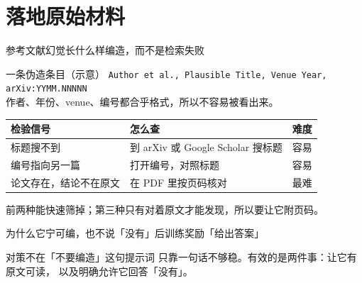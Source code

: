 \documentclass[aspectratio=169]{beamer}
\begin{document}
\section[落地材料]{落地原始材料}

\begin{frame}{参考文献幻觉长什么样}{编造，而不是检索失败}
  \begin{alertblock}{一条伪造条目（示意）}
    \small
    \texttt{Author et al., Plausible Title, Venue Year, arXiv:YYMM.NNNNN}\\[2pt]
    作者、年份、venue、编号都合乎格式，所以不容易被看出来。
  \end{alertblock}
  \begin{center}
  \footnotesize
  \begin{tabular}{lll}
    \toprule
    \textbf{检验信号} & \textbf{怎么查} & \textbf{难度} \\
    \midrule
    标题搜不到 & 到 arXiv 或 Google Scholar 搜标题 & 容易 \\
    编号指向另一篇 & 打开编号，对照标题 & 容易 \\
    论文存在，结论不在原文 & 在 PDF 里按页码核对 & 最难 \\
    \bottomrule
  \end{tabular}
  \end{center}
  \textcolor{soft}{\small 前两种能快速筛掉；第三种只有对着原文才能发现，所以要让它附页码。}
\end{frame}

\begin{frame}{为什么它宁可编，也不说「没有」}{后训练奖励「给出答案」}
  \begin{center}
  \end{center}
  \begin{block}{对策不在「不要编造」这句提示词}
    只靠一句话不够稳。有效的是两件事：让它有原文可读，
    以及明确允许它回答「没有」。
  \end{block}
\end{frame}
\end{document}

